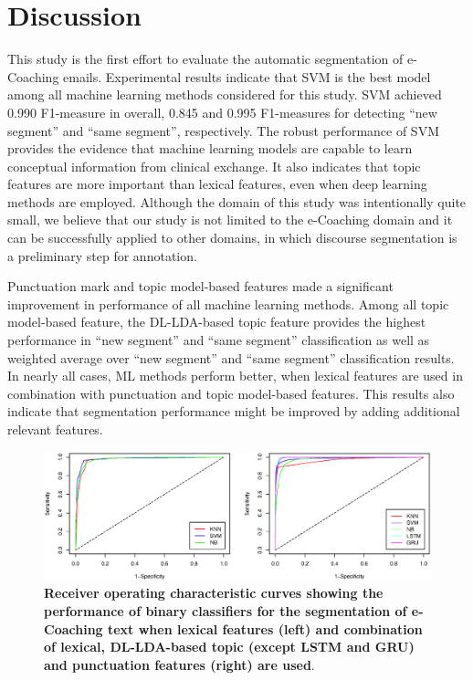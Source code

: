 \documentclass{amia}
\begin{document}
\section*{Discussion}
This study is the first effort to evaluate the automatic segmentation of e-Coaching emails. Experimental results indicate that SVM is the best model among all machine learning methods considered for this study. SVM achieved 0.990 F1-measure in overall, 0.845 and 0.995 F1-measures for detecting ``new segment'' and ``same segment'', respectively. The robust performance of SVM provides the evidence that machine learning models are capable to learn conceptual information from clinical exchange. It also indicates that topic features are more important than lexical features, even when deep learning methods are employed. Although the domain of this study was intentionally quite small, we believe that our study is not limited to the e-Coaching domain and it can be successfully applied to other domains, in which discourse segmentation is a preliminary step for annotation.

Punctuation mark and topic model-based features made a significant improvement in performance of all machine learning methods. Among all topic model-based feature, the DL-LDA-based topic feature provides the highest performance in ``new segment'' and ``same segment'' classification as well as weighted average over ``new segment'' and ``same segment'' classification results. In nearly all cases, ML methods perform better, when lexical features are used in combination with punctuation and topic model-based features. This results also indicate that segmentation performance might be improved by adding additional relevant features.         

\begin{figure}[!htb]
    \centering
    \includegraphics[width=1.0\textwidth]{figures/roc-curves.eps}
    \caption{\textbf{Receiver operating characteristic curves showing the performance of binary classifiers for the segmentation of e-Coaching text when lexical features (left) and combination of lexical, DL-LDA-based topic (except LSTM and GRU) and punctuation features (right) are used}.}
    \label{fig:roc-curves}
\end{figure}
\end{document}
